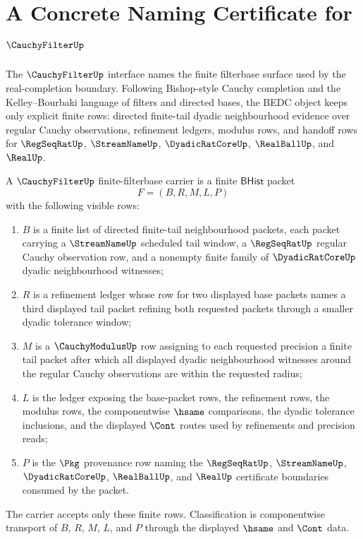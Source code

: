 \chapter{A Concrete Naming Certificate for $\CauchyFilterUp$}
\label{ch:concrete-instances-cauchyfilter-namecert}

The $\CauchyFilterUp$ interface names the finite filterbase surface used by
the real-completion boundary. Following Bishop-style Cauchy completion and
the Kelley--Bourbaki language of filters and directed bases, the BEDC object
keeps only explicit finite rows: directed finite-tail dyadic neighbourhood
evidence over regular Cauchy observations, refinement ledgers, modulus rows,
and handoff rows for $\RegSeqRatUp$, $\StreamNameUp$, $\DyadicRatCoreUp$,
$\RealBallUp$, and $\RealUp$.

\begin{definition}
\label{def:cauchyfilter-finite-filterbase-carrier}
A $\CauchyFilterUp$ finite-filterbase carrier is a finite $\mathsf{BHist}$
packet
$$
F=(B,R,M,L,P)
$$
with the following visible rows:
\begin{enumerate}
\item $B$ is a finite list of directed finite-tail neighbourhood packets,
  each packet carrying a $\StreamNameUp$ scheduled tail window, a
  $\RegSeqRatUp$ regular Cauchy observation row, and a nonempty finite family
  of $\DyadicRatCoreUp$ dyadic neighbourhood witnesses;
\item $R$ is a refinement ledger whose row for two displayed base packets
  names a third displayed tail packet refining both requested packets through
  a smaller dyadic tolerance window;
\item $M$ is a $\CauchyModulusUp$ row assigning to each requested precision a
  finite tail packet after which all displayed dyadic neighbourhood witnesses
  around the regular Cauchy observations are within the requested radius;
\item $L$ is the ledger exposing the base-packet rows, the refinement rows,
  the modulus rows, the componentwise $\hsame$ comparisons, the dyadic
  tolerance inclusions, and the displayed $\Cont$ routes used by refinements
  and precision reads;
\item $P$ is the $\Pkg$ provenance row naming the $\RegSeqRatUp$,
  $\StreamNameUp$, $\DyadicRatCoreUp$, $\RealBallUp$, and $\RealUp$ certificate
  boundaries consumed by the packet.
\end{enumerate}
The carrier accepts only these finite rows. Classification is componentwise
transport of $B$, $R$, $M$, $L$, and $P$ through the displayed $\hsame$ and
$\Cont$ data.
\end{definition}

